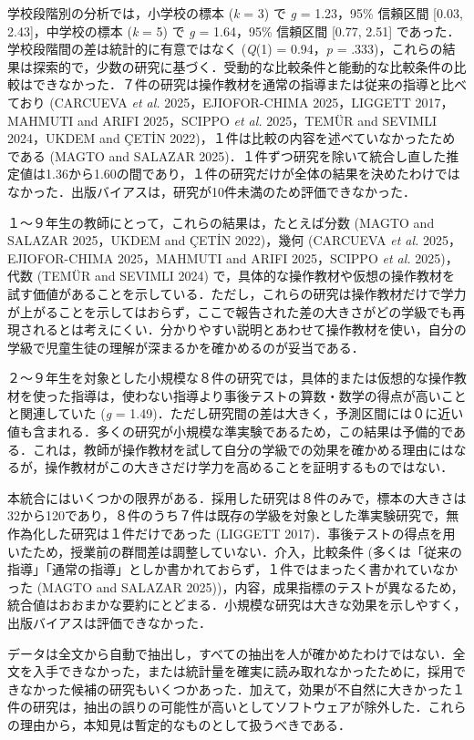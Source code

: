 \documentclass[
  lualatex, ja=standard, paper={182mm,257mm}, twocolumn, fontsize=8.5pt, baselineskip=13.5pt,
  line_length=24zw, column_gap=6.1mm, number_of_lines=45, head_space=24.5mm, gutter=16.25mm
]{jlreq}
\newcommand{\chap}[2]{\par\vspace{13.5pt}\needspace{4\baselineskip}{\centering\gtfamily\bfseries #1．#2\par}\nopagebreak}
\begin{document}
学校段階別の分析では，小学校の標本 (\textit{k} = 3) で \textit{g} = 1.23，95\% 信頼区間 [0.03, 2.43]，中学校の標本 (\textit{k} = 5) で \textit{g} = 1.64，95\% 信頼区間 [0.77, 2.51] であった．学校段階間の差は統計的に有意ではなく (\textit{Q}(1) = 0.94，\textit{p} = .333)，これらの結果は探索的で，少数の研究に基づく．受動的な比較条件と能動的な比較条件の比較はできなかった．７件の研究は操作教材を通常の指導または従来の指導と比べており (CARCUEVA \textit{et al.} 2025，EJIOFOR-CHIMA 2025，LIGGETT 2017，MAHMUTI and ARIFI 2025，SCIPPO \textit{et al.} 2025，TEMÜR and SEVIMLI 2024，UKDEM and ÇETİN 2022)，１件は比較の内容を述べていなかったためである (MAGTO and SALAZAR 2025)．１件ずつ研究を除いて統合し直した推定値は1.36から1.60の間であり，１件の研究だけが全体の結果を決めたわけではなかった．出版バイアスは，研究が10件未満のため評価できなかった．

１〜９年生の教師にとって，これらの結果は，たとえば分数 (MAGTO and SALAZAR 2025，UKDEM and ÇETİN 2022)，幾何 (CARCUEVA \textit{et al.} 2025，EJIOFOR-CHIMA 2025，MAHMUTI and ARIFI 2025，SCIPPO \textit{et al.} 2025)，代数 (TEMÜR and SEVIMLI 2024) で，具体的な操作教材や仮想の操作教材を試す価値があることを示している．ただし，これらの研究は操作教材だけで学力が上がることを示してはおらず，ここで報告された差の大きさがどの学級でも再現されるとは考えにくい．分かりやすい説明とあわせて操作教材を使い，自分の学級で児童生徒の理解が深まるかを確かめるのが妥当である．

\chap{5}{まとめ}
２〜９年生を対象とした小規模な８件の研究では，具体的または仮想的な操作教材を使った指導は，使わない指導より事後テストの算数・数学の得点が高いことと関連していた (\textit{g} = 1.49)．ただし研究間の差は大きく，予測区間には０に近い値も含まれる．多くの研究が小規模な準実験であるため，この結果は予備的である．これは，教師が操作教材を試して自分の学級での効果を確かめる理由にはなるが，操作教材がこの大きさだけ学力を高めることを証明するものではない．

本統合にはいくつかの限界がある．採用した研究は８件のみで，標本の大きさは32から120であり，８件のうち７件は既存の学級を対象とした準実験研究で，無作為化した研究は１件だけであった (LIGGETT 2017)．事後テストの得点を用いたため，授業前の群間差は調整していない．介入，比較条件 (多くは「従来の指導」「通常の指導」としか書かれておらず，１件ではまったく書かれていなかった (MAGTO and SALAZAR 2025))，内容，成果指標のテストが異なるため，統合値はおおまかな要約にとどまる．小規模な研究は大きな効果を示しやすく，出版バイアスは評価できなかった．

データは全文から自動で抽出し，すべての抽出を人が確かめたわけではない．全文を入手できなかった，または統計量を確実に読み取れなかったために，採用できなかった候補の研究もいくつかあった．加えて，効果が不自然に大きかった１件の研究は，抽出の誤りの可能性が高いとしてソフトウェアが除外した．これらの理由から，本知見は暫定的なものとして扱うべきである．
\end{document}
